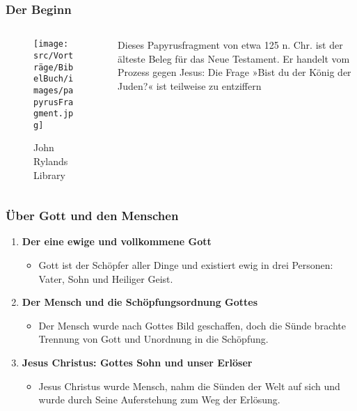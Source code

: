 \documentclass[aspectratio=43]{beamer}
\begin{document}
\begin{frame}
    \frametitle{Der Beginn}  %
    \begin{columns}
        \begin{column}{0.5\textwidth}
            \begin{figure}[t]
                \centering
                \texttt{[image: src/Vorträge/BibelBuch/images/papyrusFragment.jpg]}
                \caption{{ \textcopyright John Rylands Library}}
                \label{fig:enter-label}
            \end{figure}
        \end{column}
        \begin{column}{0.5\textwidth}
            \small Dieses Papyrusfragment von etwa 125 n. Chr. ist der älteste Beleg für das Neue Testament. Er handelt vom Prozess gegen Jesus: Die Frage »Bist du der König der Juden?« ist teilweise zu entziffern\\
        \end{column}
    \end{columns}
\end{frame}
\begin{frame}
    \frametitle{Über Gott und den Menschen}  %
    \begin{enumerate}
        \item \textbf{Der eine ewige und vollkommene Gott}
            \begin{itemize}              
                \item Gott ist der Schöpfer aller Dinge und existiert ewig in drei Personen: Vater, Sohn und Heiliger Geist.
            \end{itemize}
            \vspace{0.25cm}
        \item \textbf{Der Mensch und die Schöpfungsordnung Gottes}
            \begin{itemize}
                \item Der Mensch wurde nach Gottes Bild geschaffen, doch die Sünde brachte Trennung von Gott und Unordnung in die Schöpfung.
            \end{itemize}
            \vspace{0.25cm}
        \item \textbf{Jesus Christus: Gottes Sohn und unser Erlöser}
            \begin{itemize}
                \item Jesus Christus wurde Mensch, nahm die Sünden der Welt auf sich und wurde durch Seine Auferstehung zum Weg der Erlösung.
            \end{itemize}              
    \end{enumerate}   
\end{frame}
\end{document}
